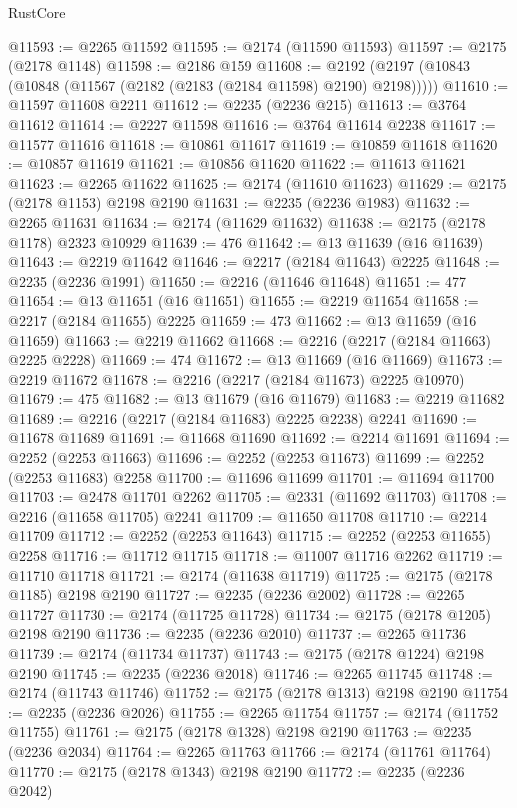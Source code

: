 \begin{lexlean}{RustCore}
\begin{coremodule}
@11593 := @2265 @11592
@11595 := @2174 (@11590 @11593)
@11597 := @2175 (@2178 @1148)
@11598 := @2186 @159
@11608 := @2192 (@2197 (@10843 (@10848 (@11567 (@2182 (@2183 (@2184 @11598) @2190) @2198)))))
@11610 := @11597 @11608 @2211
@11612 := @2235 (@2236 @215)
@11613 := @3764 @11612
@11614 := @2227 @11598
@11616 := @3764 @11614 @2238
@11617 := @11577 @11616
@11618 := @10861 @11617
@11619 := @10859 @11618
@11620 := @10857 @11619
@11621 := @10856 @11620
@11622 := @11613 @11621
@11623 := @2265 @11622
@11625 := @2174 (@11610 @11623)
@11629 := @2175 (@2178 @1153) @2198 @2190
@11631 := @2235 (@2236 @1983)
@11632 := @2265 @11631
@11634 := @2174 (@11629 @11632)
@11638 := @2175 (@2178 @1178) @2323 @10929
@11639 := 476
@11642 := @13 @11639 (@16 @11639)
@11643 := @2219 @11642
@11646 := @2217 (@2184 @11643) @2225
@11648 := @2235 (@2236 @1991)
@11650 := @2216 (@11646 @11648)
@11651 := 477
@11654 := @13 @11651 (@16 @11651)
@11655 := @2219 @11654
@11658 := @2217 (@2184 @11655) @2225
@11659 := 473
@11662 := @13 @11659 (@16 @11659)
@11663 := @2219 @11662
@11668 := @2216 (@2217 (@2184 @11663) @2225 @2228)
@11669 := 474
@11672 := @13 @11669 (@16 @11669)
@11673 := @2219 @11672
@11678 := @2216 (@2217 (@2184 @11673) @2225 @10970)
@11679 := 475
@11682 := @13 @11679 (@16 @11679)
@11683 := @2219 @11682
@11689 := @2216 (@2217 (@2184 @11683) @2225 @2238) @2241
@11690 := @11678 @11689
@11691 := @11668 @11690
@11692 := @2214 @11691
@11694 := @2252 (@2253 @11663)
@11696 := @2252 (@2253 @11673)
@11699 := @2252 (@2253 @11683) @2258
@11700 := @11696 @11699
@11701 := @11694 @11700
@11703 := @2478 @11701 @2262
@11705 := @2331 (@11692 @11703)
@11708 := @2216 (@11658 @11705) @2241
@11709 := @11650 @11708
@11710 := @2214 @11709
@11712 := @2252 (@2253 @11643)
@11715 := @2252 (@2253 @11655) @2258
@11716 := @11712 @11715
@11718 := @11007 @11716 @2262
@11719 := @11710 @11718
@11721 := @2174 (@11638 @11719)
@11725 := @2175 (@2178 @1185) @2198 @2190
@11727 := @2235 (@2236 @2002)
@11728 := @2265 @11727
@11730 := @2174 (@11725 @11728)
@11734 := @2175 (@2178 @1205) @2198 @2190
@11736 := @2235 (@2236 @2010)
@11737 := @2265 @11736
@11739 := @2174 (@11734 @11737)
@11743 := @2175 (@2178 @1224) @2198 @2190
@11745 := @2235 (@2236 @2018)
@11746 := @2265 @11745
@11748 := @2174 (@11743 @11746)
@11752 := @2175 (@2178 @1313) @2198 @2190
@11754 := @2235 (@2236 @2026)
@11755 := @2265 @11754
@11757 := @2174 (@11752 @11755)
@11761 := @2175 (@2178 @1328) @2198 @2190
@11763 := @2235 (@2236 @2034)
@11764 := @2265 @11763
@11766 := @2174 (@11761 @11764)
@11770 := @2175 (@2178 @1343) @2198 @2190
@11772 := @2235 (@2236 @2042)

\end{coremodule}
\end{lexlean}
